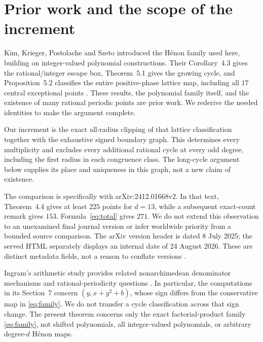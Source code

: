 \section{Prior work and the scope of the increment}\label{sec:sources}

Kim, Krieger, Postolache and Szeto introduced the H\'enon family used
here, building on integer-valued polynomial constructions. Their
Corollary~4.3 gives the rational/integer escape box, Theorem~5.1 gives
the growing cycle, and Proposition~5.2 classifies the entire
positive-phase lattice map, including all $17$ central exceptional
points \cite{kim_2025_many_v2}. These results, the polynomial family
itself, and the existence of many rational periodic points are prior
work. We rederive the needed identities to make the argument complete.

Our increment is the exact all-radius clipping of that lattice
classification together with the exhaustive signed boundary graph.
This determines every multiplicity and excludes every additional
rational cycle at every odd degree, including the first radius in
each congruence class. The long-cycle argument below supplies its
place and uniqueness in this graph, not a new claim of existence.

The comparison is specifically with arXiv:2412.01668v2. In that text,
Theorem~4.4 gives at least $225$ points for $d=13$, while a subsequent
exact-count remark gives $153$. Formula~\eqref{eq:total} gives $271$.
We do not extend this observation to an unexamined final journal
version or infer worldwide priority from a bounded source comparison.
The arXiv version header is dated 8 July 2025; the served HTML separately
displays an internal date of 24 August 2026. These are distinct metadata
fields, not a reason to conflate versions \cite{kim_2025_many_v2}.

Ingram's arithmetic study provides related nonarchimedean denominator
mechanisms and rational-periodicity questions \cite{ingram_2011_heights}.
In particular, the computations in its Section~7 concern
$(y,x+y^2+b)$, whose sign differs from the conservative map in
\eqref{eq:family}. We do not transfer a cycle classification across that
sign change. The present theorem concerns only the exact factorial-product
family \eqref{eq:family}, not shifted polynomials, all integer-valued
polynomials, or arbitrary degree-$d$ H\'enon maps.

